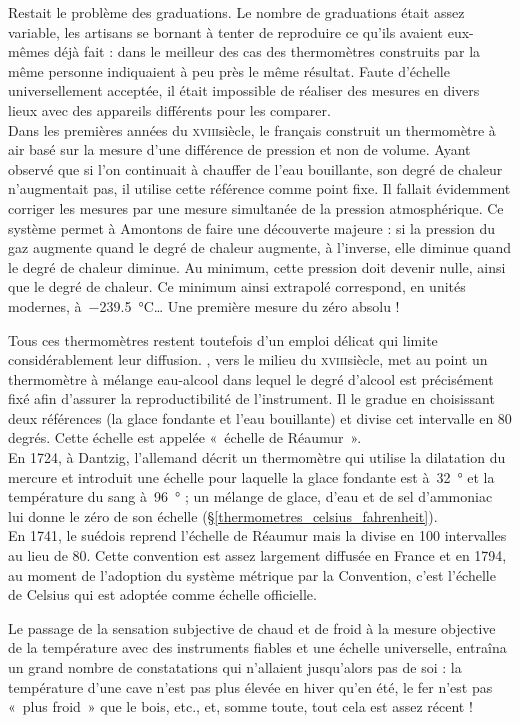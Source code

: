 	Restait le problème des graduations. Le nombre de graduations était assez variable, les artisans se bornant à tenter de reproduire ce qu'ils avaient eux-mêmes déjà fait : dans le meilleur des cas des thermomètres construits par la même personne indiquaient à peu près le même résultat. Faute d'échelle universellement acceptée, il était impossible de réaliser des mesures en divers lieux avec des appareils différents pour les comparer.\\
	Dans les premières années du \textsc{xviii}\ieme siècle, le français  construit un thermomètre à air basé sur la mesure d'une différence de pression et non de volume. Ayant observé que si l'on continuait à chauffer de l'eau bouillante, son degré de chaleur n'augmentait pas, il utilise cette référence comme point fixe. Il fallait évidemment corriger les mesures par une mesure simultanée de la pression atmosphérique. Ce système permet à Amontons de faire une découverte majeure : si la pression du gaz augmente quand le degré de chaleur augmente, à l'inverse, elle diminue quand le degré de chaleur diminue. Au minimum, cette pression doit devenir nulle, ainsi que le degré de chaleur. Ce minimum ainsi extrapolé correspond, en unités modernes, à~\SI{-239,5}{\degreeCelsius}… Une première mesure du zéro absolu !
	
	Tous ces thermomètres restent toutefois d'un emploi délicat qui limite considérablement leur diffusion. , vers le milieu du \textsc{xviii}\ieme siècle, met au point un thermomètre à mélange eau-alcool dans lequel le degré d'alcool est précisément fixé afin d'assurer la reproductibilité de l'instrument. Il le gradue en choisissant deux références (la glace fondante et l'eau bouillante) et divise cet intervalle en 80 degrés. Cette échelle est appelée «~échelle de Réaumur~».\\	
	En 1724, à Dantzig, l’allemand  décrit un thermomètre qui utilise la dilatation du mercure et introduit une échelle pour laquelle la glace fondante est à~\SI{32}{\degree} et la température du sang à~\SI{96}{\degree} ; un mélange de glace, d'eau et de sel d'ammoniac lui donne le zéro de son échelle (\S\ref{thermometres_celsius_fahrenheit}).\\	
	En 1741, le suédois  reprend l'échelle de Réaumur mais la divise en 100 intervalles au lieu de 80. Cette convention est assez largement diffusée en France et en 1794, au moment de l'adoption du système métrique par la Convention, c'est l'échelle de Celsius qui est adoptée comme échelle officielle.

	Le passage de la sensation subjective de chaud et de froid à la mesure objective de la température avec des instruments fiables et une échelle universelle, entraîna un grand nombre de constatations qui n'allaient jusqu'alors pas de soi : la température d'une cave n'est pas plus élevée en hiver qu'en été, le fer n'est pas «~plus froid~» que le bois, etc., et, somme toute, tout cela est assez récent !

\atendofhistorysection
